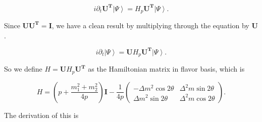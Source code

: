 \documentclass{tufte-handout}
\newcommand{\ket}[1]{\left| #1\right\rangle}
\begin{document}
\begin{equation*}
i\partial_t \mathbf{U^T} \ket{\Psi} = H_p \mathbf{U^T} \ket{\Psi}.
\end{equation*}

Since $\mathbf{U}\mathbf{U^T}=\mathbf{I}$, we have a clean result by multiplying through the equation by $\mathbf{U}$.

\begin{equation*}
i\partial_t \ket{\Psi} = \mathbf{U} H_p \mathbf{U^T} \ket{\Psi}.
\end{equation*}

So we define $H = \mathbf{U}H_p \mathbf{U^T}$ as the Hamiltonian matrix in flavor basis, which is


\begin{equation}
H = \left(p + \frac{m_1^2+m_2^2}{4p} \right)\mathbf I - \frac{1}{4p}\begin{pmatrix} - \Delta m^2 \cos 2\theta & \Delta^2 m \sin 2\theta \\  \Delta m^2 \sin 2\theta & \Delta^2 m\cos 2\theta \end{pmatrix}.
\end{equation}

The derivation of this is
\end{document}
